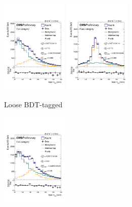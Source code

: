\begin{figure}[]
    \begin{center}
        \begin{subfigure}[t]{\textwidth}
    \begin{center}
            \includegraphics[width=0.35\textwidth]{figures/toptagging/sf/loose_fail.pdf}
            \includegraphics[width=0.35\textwidth]{figures/toptagging/sf/loose_pass.pdf}
            \caption{Loose BDT-tagged}
    \end{center}
        \end{subfigure}
        \begin{subfigure}[t]{\textwidth}
    \begin{center}
            \includegraphics[width=0.35\textwidth]{figures/toptagging/sf/tight_fail.pdf}

\end{center}
\end{subfigure}
\end{center}
\end{figure}
